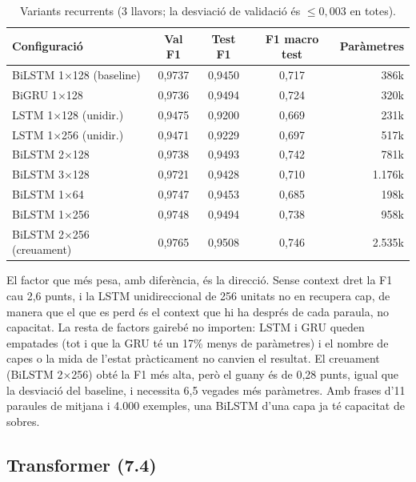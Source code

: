 \begin{table}[ht]
\centering\small
\caption{Variants recurrents (3 llavors; la desviació de validació és $\le 0{,}003$ en totes).}
\label{tab:rnn}
\begin{tabular}{lcccr}
\toprule
Configuració & Val F1 & Test F1 & F1 macro test & Paràmetres \\
\midrule
BiLSTM 1$\times$128 (baseline) & 0,9737 & 0,9450 & 0,717 & 386k \\
BiGRU 1$\times$128             & 0,9736 & 0,9494 & 0,724 & 320k \\
LSTM 1$\times$128 (unidir.)    & 0,9475 & 0,9200 & 0,669 & 231k \\
LSTM 1$\times$256 (unidir.)    & 0,9471 & 0,9229 & 0,697 & 517k \\
BiLSTM 2$\times$128            & 0,9738 & 0,9493 & 0,742 & 781k \\
BiLSTM 3$\times$128            & 0,9721 & 0,9428 & 0,710 & 1.176k \\
BiLSTM 1$\times$64             & 0,9747 & 0,9453 & 0,685 & 198k \\
BiLSTM 1$\times$256            & 0,9748 & 0,9494 & 0,738 & 958k \\
BiLSTM 2$\times$256 (creuament) & 0,9765 & 0,9508 & 0,746 & 2.535k \\
\bottomrule
\end{tabular}
\end{table}

El factor que més pesa, amb diferència, és la direcció. Sense context dret la F1 cau 2,6 punts, i la LSTM
unidireccional de 256 unitats no en recupera cap, de manera que el que es perd és el context que hi ha després de
cada paraula, no capacitat. La resta de factors gairebé no importen: LSTM i GRU queden empatades (tot i que la GRU
té un 17\% menys de paràmetres) i el nombre de capes o la mida de l'estat pràcticament no canvien el resultat. El
creuament (BiLSTM 2$\times$256) obté la F1 més alta, però el guany és de 0,28 punts, igual que la desviació del
baseline, i necessita 6,5 vegades més paràmetres. Amb frases d'11 paraules de mitjana i 4.000 exemples, una BiLSTM
d'una capa ja té capacitat de sobres.

\subsection{Transformer (7.4)}
\label{sec:transformer}

